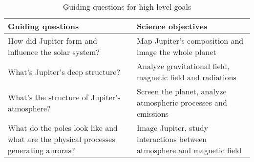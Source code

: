 \begin{table}[H]
    \renewcommand{\arraystretch}{1.5}
    \centering
    \begin{tabularx}{\linewidth}{|X|X|}
        \hline
        \textbf{Guiding questions} & \textbf{Science objectives} \\
        \hline
        How did Jupiter form and influence the solar system? & Map Jupiter's composition and image the whole planet \\ 
        \hline
        What's Jupiter's deep structure? & Analyze gravitational field, magnetic field and radiations \\
        \hline
        What's the structure of Jupiter's atmosphere? & Screen the planet, analyze atmospheric processes and emissions \\
        \hline
        What do the poles look like and what are the physical processes generating auroras? & Image Jupiter, study interactions between atmosphere and magnetic field \\
        \hline
    \end{tabularx}
    \caption{Guiding questions for high level goals}
    \label{table:goal_questions}
\end{table}